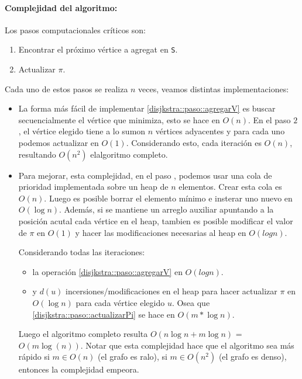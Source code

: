 \paragraph{Complejidad del algoritmo:} Los pasos computacionales críticos son:
\begin{enumerate}
  \item\label{disjkstra::paso::agregarV} Encontrar el próximo vértice a agregat en \texttt{S}.
  \item\label{disjkstra::paso::actualizarPi} Actualizar \(\pi\).
\end{enumerate}

Cada uno de estos pasos se realiza \(n\) veces, veamos distintas implementaciones:

\begin{itemize}
  \item La forma más fácil de implementar \ref{disjkstra::paso::agregarV} es buscar secuencialmente el vértice que minimiza, esto se hace en \(O(n)\). En el paso \(2\), el vértice elegido tiene a lo sumon \(n\) vértices adyacentes y para cada uno podemos actualizar en \(O(1)\). Considerando esto, cada iteración es \(O(n)\), resultando \(O(n^2)\) elalgoritmo completo.
  \item Para mejorar, esta complejidad, en el paso \label{dijsktra::paso::agregarV}, podemos usar una cola de prioridad implementada sobre un heap de \(n\) elementos. Crear esta cola es \(O(n)\). Luego es posible borrar el elemento mínimo e insterar uno nuevo en \(O(\log{n})\). Además, si se mantiene un arreglo auxiliar apuntando a la posición acutal cada vértice en el heap, tambien es posible modificar el valor de \(\pi\) en \(O(1)\) y hacer las modificaciones necesarias al heap en \(O(log n)\).

        Considerando todas las iteraciones:
        \begin{itemize}
          \item la operación \ref{disjkstra::paso::agregarV} en \(O(log n)\).
          \item y \(d(u)\) incersiones/modificaciones en el heap para hacer actualizar \(\pi\) en \(O(\log{n})\) para cada vértice elegido \(u\). Osea que \ref{disjkstra::paso::actualizarPi} se hace en \(O(m*\log{n})\).
        \end{itemize}

        Luego el algoritmo completo resulta \(O(n\log{n} + m\log{n})\) = \(O(m\log(n))\). Notar que esta complejidad hace que el algoritmo sea más rápido si \(m\in O(n)\) (el grafo es ralo), si \(m\in O(n^2)\) (el grafo es denso), entonces la complejidad empeora.
\end{itemize}

